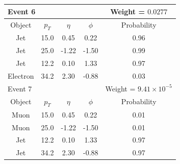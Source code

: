 \documentclass{cmspaper}
\begin{document}
\begin{tabular}{|c|c|c|c|c|}
\multicolumn{4}{|l|}{Event 6} & Weight = $ 0.0277$ \\
\hline
Object & $p_T$ & $\eta$ & $\phi$ & Probability \\ 
 \hline 
Jet & 15.0 & 0.45 & 0.22 & 0.96 \\
Jet & 25.0 & -1.22 & -1.50 & 0.99 \\
Jet & 12.2 & 0.10 & 1.33 &  0.97 \\
Electron & 34.2 & 2.30 & -0.88 & 0.03 \\
 \hline 
 \hline 


\multicolumn{4}{|l|}{Event 7} & Weight = $9.41 \times 10^{-5}$ \\
\hline
Object & $p_T$ & $\eta$ & $\phi$ & Probability \\ 
 \hline 
Muon & 15.0 & 0.45 & 0.22 & 0.01 \\
Muon & 25.0 & -1.22 & -1.50 & 0.01 \\
Jet & 12.2 & 0.10 & 1.33 &  0.97 \\
Jet & 34.2 & 2.30 & -0.88 & 0.97 \\
 \hline 
 \hline 
\end{tabular} 
\end{document}
